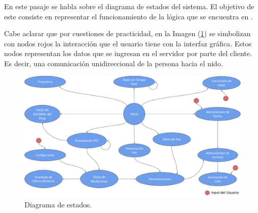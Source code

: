 En este pasaje se habla sobre el diagrama de estados del sistema. El objetivo de este consiste en representar el funcionamiento de la lógica que se encuentra en \nodered.

Cabe aclarar que por cuestiones de practicidad, en la Imagen (\ref{fig:diagrama_de_estados}) se simbolizan con nodos rojos la interacción que el usuario tiene con la interfaz gráfica. Estos nodos representan los datos que se ingresan en el servidor por parte del cliente. Es decir, una comunicación unidireccional de la persona hacia el nido.

\begin{figure}[H]
	\centering	
	\includegraphics[width=\textwidth, page=1]{ImagenesIngenieria de Detalle/FlowChartNodeRed.pdf}	
	\caption{Diagrama de estados.}
	\label{fig:diagrama_de_estados}
\end{figure}
